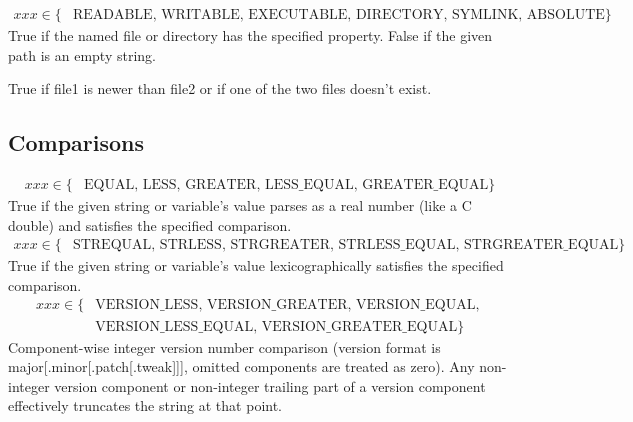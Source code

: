 \noindent\makebox[\linewidth]{\rule{\columnwidth}{1pt}}
\begin{center}  \end{center}
\begin{align*}
    xxx \in \{ &\text{READABLE},\,\text{WRITABLE},\,\text{EXECUTABLE},\,\text{DIRECTORY},\,\text{SYMLINK},\,\text{ABSOLUTE} \}
\end{align*}
True if the named file or directory has the specified property. False if the given path is an empty string.

\noindent\makebox[\linewidth]{\rule{\columnwidth}{1pt}}
\begin{center}  \end{center}
True if file1 is newer than file2 or if one of the two files doesn't exist. \\



\subsection{Comparisons}
\begin{center}  \end{center}
\noindent\makebox[\linewidth]{\rule{\columnwidth}{1pt}}
\begin{align*}
    xxx \in \{ &\text{EQUAL},\,\text{LESS},\,\text{GREATER},\,\text{LESS\_EQUAL},\,\text{GREATER\_EQUAL} \}
\end{align*}
True if the given string or variable's value parses as a real number (like a C double) and satisfies the specified comparison. \\

\noindent\makebox[\linewidth]{\rule{\columnwidth}{1pt}}
\begin{align*}
    xxx \in \{ &\text{STREQUAL},\,\text{STRLESS},\,\text{STRGREATER},\,\text{STRLESS\_EQUAL},\,\text{STRGREATER\_EQUAL} \}
\end{align*}
True if the given string or variable's value lexicographically satisfies the specified comparison. \\

\noindent\makebox[\linewidth]{\rule{\columnwidth}{1pt}}
\begin{align*}
    xxx \in \{ &\text{VERSION\_LESS},\,\text{VERSION\_GREATER},\,\text{VERSION\_EQUAL},\, \\
    &\text{VERSION\_LESS\_EQUAL},\,\text{VERSION\_GREATER\_EQUAL} \}
\end{align*}
Component-wise integer version number comparison (version format is major[.minor[.patch[.tweak]]], omitted components are treated as zero). Any non-integer version component or non-integer trailing part of a version component effectively truncates the string at that point. \\

